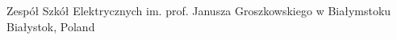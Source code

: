 

\begin{cventries}

  \cventry
  {}
    {Zespół Szkół Elektrycznych im. prof. Janusza Groszkowskiego w Białymstoku} %
    {Białystok, Poland} %
    {}
    {}
\end{cventries}
